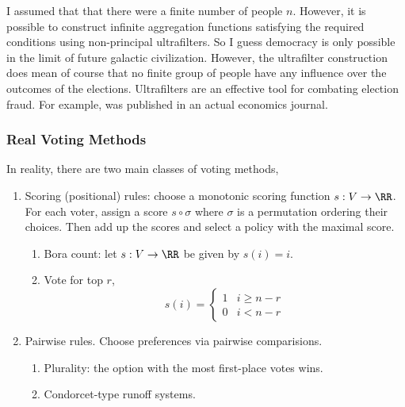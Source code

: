 \documentclass[12pt]{article}
\begin{document}
\begin{rmk}
I assumed that that there were a finite number of people $n$. However, it is possible to construct infinite aggregation functions satisfying the required conditions using non-principal ultrafilters. So I guess democracy is only possible in the limit of future galactic civilization. However, the ultrafilter construction does mean of course that no finite group of people have any influence over the outcomes of the elections. Ultrafilters are an effective tool for combating election fraud. For example,  was published in an actual economics journal.
\end{rmk}

\subsubsection{Real Voting Methods}

In reality, there are two main classes of voting methods,
\begin{enumerate}
\item Scoring (positional) rules: choose a monotonic scoring function $s : V \to \RR$. For each voter, assign a score $s \circ \sigma$ where $\sigma$ is a permutation ordering their choices. Then add up the scores and select a policy with the maximal score.

\begin{enumerate}
\item Bora count: let $s : V \to \RR$ be given by $s(i) = i$.

\item Vote for top $r$,
\[ s(i) = \begin{cases}
1 & i \ge n - r
\\
0 & i < n - r
\end{cases} \] 
\end{enumerate}

\item Pairwise rules. Choose preferences via pairwise comparisions.

\begin{enumerate}
\item Plurality: the option with the most first-place votes wins.

\item Condorcet-type runoff systems. 
\end{enumerate}  
\end{enumerate}
\end{document}
